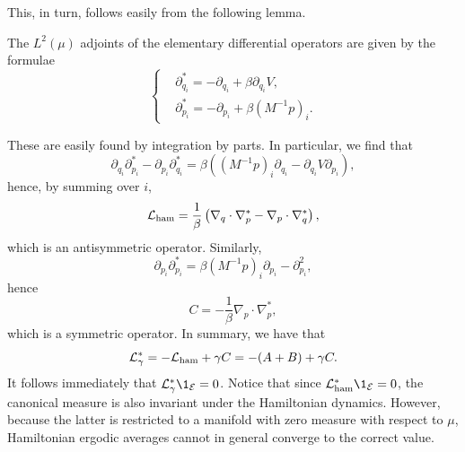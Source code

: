     This, in turn, follows easily from the following lemma.
    \begin{lemma}
        \label{lemma:star_adjoints_langevin}
        The $L^2(\mu)$ adjoints of the elementary differential operators are given by the formulae
        \begin{equation}
            \label{eq:star_adjoints_langevin}
            \left\{\begin{aligned}
            &\partial_{q_i}^*=-\partial_{q_i}+\beta\partial_{q_i}V,\\
            &\partial_{p_i}^*=-\partial_{p_i}+\beta\left(M^{-1}p\right)_i.
            \end{aligned}\right.
        \end{equation}
    \end{lemma}
    These are easily found by integration by parts. In particular, we find that 
    $$\partial_{q_i}\partial_{p_i}^*-\partial_{p_i}\partial_{q_i}^*=\beta\left((M^{-1}p)_i\partial_{q_i}-\partial_{q_i}V\partial_{p_i}\right),$$
    hence, by summing over $i$,
    \begin{equation}
        \label{eq:L_ham_antisymmetric}
        \mathcal{L}_{\rm ham}=\frac1\beta\left(\nabla_q\cdot\nabla_p^*-\nabla_p\cdot\nabla_q^*\right),
    \end{equation}
    which is an antisymmetric operator. Similarly,
    $$\partial_{p_i}\partial_{p_i}^*=\beta(M^{-1}p)_i\partial_{p_i}-\partial_{p_i}^2,$$
    hence
    \begin{equation}
        \label{eq:C_symmetric}
        C=-\frac{1}\beta\nabla_p\cdot\nabla_p^*,
    \end{equation}
    which is a symmetric operator. In summary, we have that 
    \begin{equation}
        \label{eq:L_star}
        \mathcal{L}_\gamma^*=-\mathcal{L}_{\rm ham}+\gamma C=-(A+B)+\gamma C.
    \end{equation}
    It follows immediately that $\cL_\gamma^*\1_{\mathcal E}=0$. Notice that since $\cLham^*\1_{\mathcal E}=0$, the canonical measure is also invariant under the Hamiltonian dynamics. However, because the latter is restricted to a manifold with zero measure with respect to $\mu$, Hamiltonian ergodic averages cannot in general converge to the correct value.
